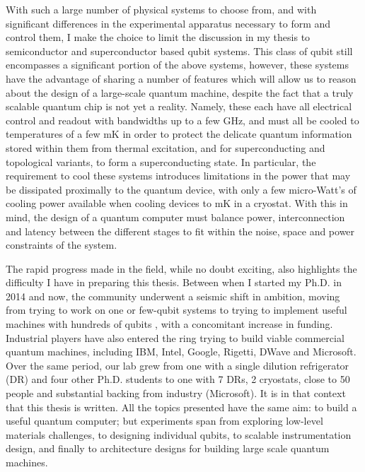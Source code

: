 With such a large number of physical systems to choose from, and with significant differences in the experimental
apparatus necessary to form and control them, I make the choice to limit the discussion in my thesis to semiconductor and superconductor
based qubit systems. This class of qubit still encompasses a significant portion of the above systems, however, these systems
have the advantage of sharing a number of features which will allow us to reason about the design of a large-scale quantum machine,
despite the fact that a truly scalable quantum chip is not yet a reality. Namely, these each have all electrical control and
readout with bandwidths up to a few \si{\giga\hertz}, and must all be cooled to temperatures of a few \si{\milli\kelvin} in order to protect the delicate
quantum information stored within them from thermal excitation, and for superconducting and topological variants, to form a superconducting
state. In particular, the requirement to cool these systems introduces limitations in the power that may be dissipated proximally to the quantum device,
with only a few micro-Watt's of cooling power available when cooling devices to \si{\milli\kelvin} in a cryostat. With this in mind,
the design of a quantum computer must balance power, interconnection and latency between the different stages to fit within the noise,
space and power constraints of the system.

The rapid progress made in the field, while no doubt exciting, also highlights the difficulty I have in
preparing this thesis. Between when I started my Ph.D. in 2014 and now, the community underwent a seismic
shift in ambition, moving from trying to work on one or few-qubit systems \cite{iarpa_mqco} to trying
to implement useful machines with hundreds of qubits \cite{Monroe440}, with a concomitant increase in
funding. Industrial players have also entered the ring trying to build viable commercial quantum machines,
including IBM, Intel, Google, Rigetti, DWave and Microsoft. Over the same period, our lab grew from one with a
single dilution refrigerator (DR) and four other Ph.D. students to one with 7 DRs, 2 cryostats, close to 50 people
and substantial backing from industry (Microsoft). It is in that context that this thesis is written. All the topics
presented have the same aim: to build a useful quantum computer; but experiments span from exploring low-level materials
challenges, to designing individual qubits, to scalable instrumentation design, and finally to architecture
designs for building large scale quantum machines.

